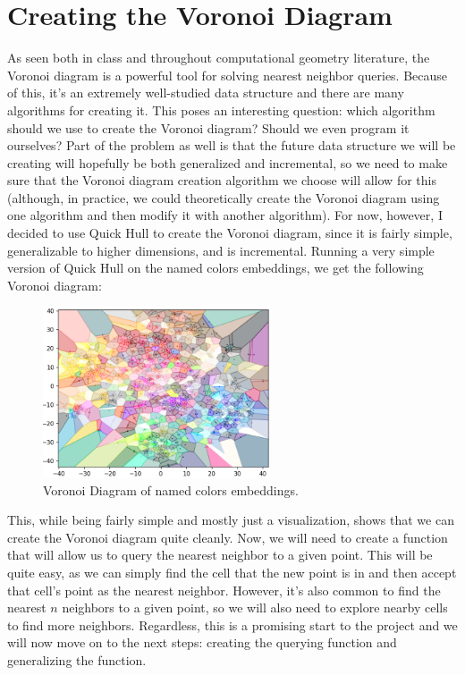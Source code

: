 \documentclass{article}
\begin{document}
\section{Creating the Voronoi Diagram}
As seen both in class and throughout computational geometry literature, 
the Voronoi diagram is a powerful tool for solving nearest neighbor queries.
Because of this, it's an extremely well-studied data structure and there are
many algorithms for creating it. This poses an interesting question: which
algorithm should we use to create the Voronoi diagram? Should we even program
it ourselves? Part of the problem as well is that the future data structure
we will be creating will hopefully be both generalized and incremental, so
we need to make sure that the Voronoi diagram creation algorithm we choose
will allow for this (although, in practice, we could theoretically create
the Voronoi diagram using one algorithm and then modify it with another algorithm).
For now, however, I decided to use Quick Hull to create the Voronoi diagram, since
it is fairly simple, generalizable to higher dimensions, and is incremental.
Running a very simple version of Quick Hull on the named colors embeddings, we get
the following Voronoi diagram:

\begin{figure}[H]
\centering
\includegraphics[width=0.6\textwidth]{images/tsne_voronoi_diagram.png}
\caption{Voronoi Diagram of named colors embeddings.}
\label{fig:voronoidiagram}
\end{figure}

\noindent
This, while being fairly simple and mostly just a visualization,
shows that we can create the Voronoi diagram quite cleanly. Now, 
we will need to create a function that will allow us to query the
nearest neighbor to a given point. This will be quite easy, as we
can simply find the cell that the new point is in and then accept
that cell's point as the nearest neighbor. However, it's also common
to find the nearest $n$ neighbors to a given point, so we will also
need to explore nearby cells to find more neighbors. Regardless, this
is a promising start to the project and we will now move on to the 
next steps: creating the querying function and generalizing the function.
\end{document}
